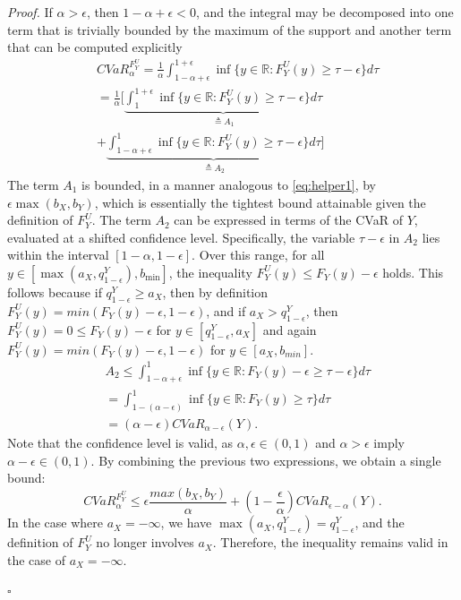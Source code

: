 \documentclass[letterpaper]{article} %
\newenvironment{proof}{\noindent\textit{Proof.}}{\hfill$\square$}
\begin{document}
\begin{proof}
	If $\alpha > \epsilon$, then $1 - \alpha + \epsilon < 0$, and the integral may be decomposed into one term that is trivially bounded by the maximum of the support and another term that can be computed explicitly
	\begin{equation}
		\begin{aligned}
			&CVaR_\alpha^{F_Y^U}=\frac{1}{\alpha}\int_{1-\alpha+\epsilon}^{1+\epsilon} \inf \{y\in \mathbb{R}:F_Y^U(y)\geq \tau -\epsilon\} d\tau \\
			&=\frac{1}{\alpha}[\underbrace{\int_{1}^{1+\epsilon} \inf \{y\in \mathbb{R}:F_Y^U(y)\geq \tau -\epsilon\} d\tau}_{\triangleq A_1} \\
			&+\underbrace{\int_{1-\alpha+\epsilon}^{1} \inf \{y\in \mathbb{R}:F_Y^U(y)\geq \tau -\epsilon\} d\tau}_{\triangleq A_2}]
		\end{aligned}
	\end{equation}
	The term $A_1$ is bounded, in a manner analogous to \eqref{eq:helper1}, by $\epsilon \max(b_X, b_Y)$, which is essentially the tightest bound attainable given the definition of $F_Y^U$. The term $A_2$ can be expressed in terms of the CVaR of $Y$, evaluated at a shifted confidence level. Specifically, the variable $\tau - \epsilon$ in $A_2$ lies within the interval $[1 - \alpha, 1 - \epsilon]$. Over this range, for all $y \in [\max(a_X, q_{1-\epsilon}^Y), b_{\min}]$, the inequality $F_Y^U(y) \leq F_Y(y) - \epsilon$ holds. This follows because if $q_{1-\epsilon}^Y \geq a_X$, then by definition $F_Y^U(y) = min(F_Y(y) - \epsilon, 1-\epsilon)$, and if $a_X > q_{1-\epsilon}^Y$, then $F_Y^U(y)=0 \leq F_Y(y) - \epsilon$ for $y\in [q_{1-\epsilon}^Y, a_X]$ and again $F_Y^U(y) = min(F_Y(y) - \epsilon, 1-\epsilon)$ for $y\in [a_X, b_{min}]$.
	\begin{equation}
		\begin{aligned}
			&A_2 \leq \int_{1-\alpha+\epsilon}^1 \inf \{y\in \mathbb{R}:F_Y(y) - \epsilon \geq \tau -\epsilon\}d\tau \\
			&=\int_{1-(\alpha-\epsilon)}^1 \inf \{y\in \mathbb{R}:F_Y(y) \geq \tau\}d\tau \\
			&=(\alpha-\epsilon)CVaR_{\alpha-\epsilon}(Y).
		\end{aligned}
	\end{equation}
	Note that the confidence level is valid, as $\alpha, \epsilon \in (0,1)$ and $\alpha > \epsilon$ imply $\alpha-\epsilon \in (0, 1)$. By combining the previous two expressions, we obtain a single bound:
	\begin{equation}
		CVaR_\alpha^{F_Y^U} \leq \epsilon\frac{max(b_X,b_Y)}{\alpha} + (1 - \frac{\epsilon}{\alpha})CVaR_{\epsilon-\alpha}(Y).
	\end{equation}
	In the case where $a_X = -\infty$, we have $\max(a_X, q_{1-\epsilon}^Y) = q_{1-\epsilon}^Y$, and the definition of $F_Y^U$ no longer involves $a_X$. Therefore, the inequality remains valid in the case of $a_X = -\infty$.
		

\end{proof}
\end{document}
